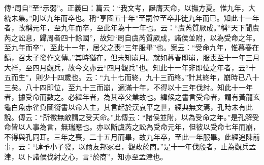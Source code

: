 {\noindent\zhuan{}\fzbyks 傳“周自”至“示弱”。正義曰：篇云：“我文考，誕膺天命，以撫方夏。惟九年，大統未集。”則以九年而卒也。稱“享國五十年”至嗣位至卒非徒九年而已。知此十一年者，改稱元年，至九年而卒，至此年為十一年也。云：“虞芮質厥成。”稱“天下聞虞芮之訟息，歸周者四十餘國”，故知“周自虞芮質厥成，諸侯並附，以為受命之年。至九年而卒”，至此十一年，居父之喪“三年服畢”也。案云：“受命九年，惟暮春在鎬，召太子發作文傳。”其時猶在，但未知崩月。就如暮春即崩，服喪至十一年三月大祥，至四月觀兵，故今文亦云“四月觀兵”也。知此十一年非即位之年者，云“十五而生”，則少十四歲也。云：“九十七而終，九十三而終。”計其終年，崩時已八十三矣。八十四即位，至九十三而崩，適滿十年，不得以十三年伐紂。知此十一年者，據受命而數之。必繼年者，為其卒父業故也。緯候之書言受命者，謂有黃龍玄龜白魚赤雀負圖銜書以命人主，其言起於漢哀平之世，經典無文焉，孔時未有此說。傳云：“所徵無敵謂之受天命。”此傳云：“諸侯並附，以為受命之年。”是孔解受命皆以人事為言，無瑞應也。亦以斷虞芮之訟為受命元年，但彼以受命七年而崩，不得與孔同耳。三年之喪，二十五月而畢，故九年卒，至此一年服畢。此經追陳前事，云：“肆予小子發，以爾友邦冢君，觀政於商。”是十一年伐殷者，止為觀兵孟津，以卜諸侯伐紂之心，言“於商”，知亦至孟津也。 \par}

